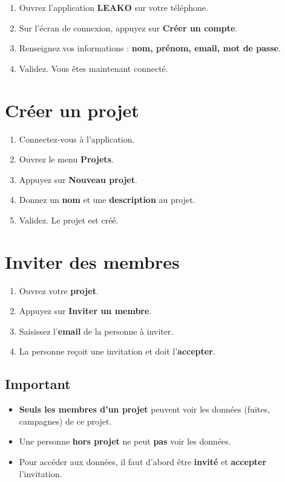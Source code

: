 \documentclass[11pt,a4paper]{article}
\begin{document}
\begin{enumerate}[leftmargin=2em]
    \item Ouvrez l'application \textbf{LEAKO} sur votre téléphone.
    \item Sur l'écran de connexion, appuyez sur \textbf{Créer un compte}.
    \item Renseignez vos informations : \textbf{nom, prénom, email, mot de passe}.
    \item Validez. Vous êtes maintenant connecté.
\end{enumerate}

\section{Créer un projet}

\begin{enumerate}[leftmargin=2em]
    \item Connectez-vous à l'application.
    \item Ouvrez le menu \textbf{Projets}.
    \item Appuyez sur \textbf{Nouveau projet}.
    \item Donnez un \textbf{nom} et une \textbf{description} au projet.
    \item Validez. Le projet est créé.
\end{enumerate}

\section{Inviter des membres}

\begin{enumerate}[leftmargin=2em]
    \item Ouvrez votre \textbf{projet}.
    \item Appuyez sur \textbf{Inviter un membre}.
    \item Saisissez l'\textbf{email} de la personne à inviter.
    \item La personne reçoit une invitation et doit l'\textbf{accepter}.
\end{enumerate}

\subsection{Important}
\begin{itemize}
    \item \textbf{Seuls les membres d'un projet} peuvent voir les données (fuites, campagnes) de ce projet.
    \item Une personne \textbf{hors projet} ne peut \textbf{pas} voir les données.
    \item Pour accéder aux données, il faut d'abord être \textbf{invité} et \textbf{accepter} l'invitation.
\end{itemize}
\end{document}

